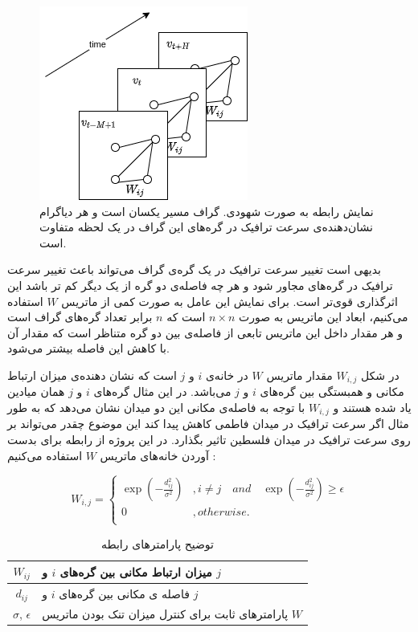 \documentclass{article}
\begin{document}
\begin{figure}
  \includegraphics{./images/base.png}
  \centering
  \caption{
نمایش رابطه  به صورت شهودی.
گراف مسیر یکسان است و هر دیاگرام نشان‌دهنده‌ی سرعت ترافیک در گره‌های این گراف در یک لحظه متفاوت است.
}
  \label{fig:base}
\end{figure}

بدیهی است تغییر سرعت ترافیک در یک گره‌ی گراف می‌تواند باعث تغییر سرعت ترافیک در گره‌های مجاور شود و هر چه فاصله‌ی دو گره از یک دیگر کم تر باشد این اثرگذاری قوی‌تر است.
برای نمایش این عامل به صورت کمی از ماتریس $W$ استفاده می‌کنیم، ابعاد این ماتریس به صورت $n \times n$ است که $n$ برابر تعداد گره‌های گراف است و هر مقدار داخل این ماتریس تابعی از فاصله‌ی بین دو گره متناظر است که مقدار آن با کاهش این فاصله بیشتر می‌شود.

در شکل  $W_{i,j}$ مقدار ماتریس $W$ در خانه‌ی $i$ و $j$ است که نشان دهنده‌ی میزان ارتباط مکانی و همبستگی بین گره‌های $i$ و $j$ می‌باشد.
در این مثال گره‌های $i$ و $j$ همان میادین یاد شده هستند و $W_{i,j}$ با توجه به فاصله‌ی مکانی این دو میدان نشان می‌دهد که
به طور مثال اگر سرعت ترافیک در میدان فاطمی کاهش پیدا کند این موضوع چقدر می‌تواند بر روی سرعت ترافیک در میدان فلسطین تاثیر بگذارد.
در این پروژه از رابطه‌  برای بدست آوردن خانه‌های ماتریس $W$ استفاده می‌کنیم :

\begin{equation}
  W_{i,j} = \left\{
    \begin{array}{ll}
      \exp(-\frac{d^{2}_{ij}}{\sigma^{2}}) & , i \neq j \quad and \quad \exp(-\frac{d^{2}_{ij}}{\sigma^{2}}) \geq \epsilon \\
      0 & , otherwise. \\
    \end{array}\right.
  \label{eq:distance}
\end{equation}

\begin{table}[h]
  \centering
  \caption{توضیح پارامترهای رابطه }
  \begin{tabular}{|c|p{}|}
    \hline
    $W_{ij}$ & میزان ارتباط مکانی بین گره‌های $i$ و $j$ \\
    \hline
    $d_{ij}$ & فاصله ی مکانی بین گره‌های $i$ و $j$ \\
    \hline
    $\sigma$, $\epsilon$ & پارامترهای ثابت برای کنترل میزان تنک{Sparsity} بودن ماتریس $W$ \\
    \hline
  \end{tabular}
  \label{tbl:distance}
\end{table}
\end{document}
